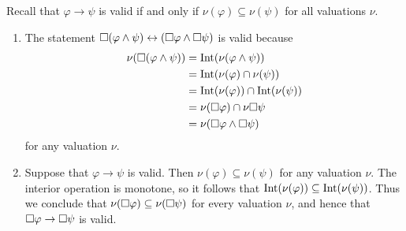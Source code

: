 \documentclass{article}
\begin{document}
\begin{ex}
Recall that $\varphi\to\psi$ is valid if
and only if $\nu(\varphi)\subseteq\nu(\psi)$ for all valuations $\nu$. 
\begin{enumerate}
\item The statement $\square(\varphi\land\psi)\leftrightarrow(\square\varphi\land\square\psi)$
is valid because
\begin{align*}
\nu(\square(\varphi\land\psi))
  & =
\mathrm{Int}(\nu(\varphi\land\psi))
  \\
  & =
\mathrm{Int}(\nu(\varphi)\cap\nu(\psi))
  \\
  & =
\mathrm{Int}(\nu(\varphi))\cap\mathrm{Int}(\nu(\psi))
  \\
  & =
\nu(\square\varphi)\cap\nu{\square\psi}
  \\
  & =
\nu(\square\varphi\land\square\psi)
\end{align*}
for any valuation $\nu$.
\item Suppose that $\varphi\to\psi$ is valid. Then $\nu(\varphi)\subseteq\nu(\psi)$
for any valuation $\nu$. The interior operation is monotone, so it follows that
$\mathrm{Int}(\nu(\varphi))\subseteq\mathrm{Int}(\nu(\psi))$. Thus we conclude that
$\nu(\square\varphi)\subseteq\nu(\square\psi)$ for every valuation $\nu$, 
and hence that $\square\varphi\to\square\psi$ is valid.
\end{enumerate}
\end{ex}
\end{document}
